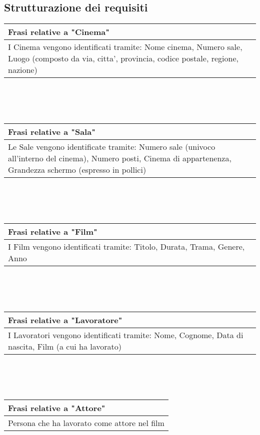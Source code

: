 \documentclass[10pt]{article}
\begin{document}
 	\subsection{Strutturazione dei requisiti}
	\begin{tabular} { |p{16.8cm}| }
 		\hline
 		\rowcolor{lightgray}
 		\textbf{Frasi relative a "Cinema"} \\
 		\hline
 		I Cinema vengono identificati tramite: Nome cinema, Numero sale, Luogo (composto da via, citta', provincia, codice postale, regione, nazione) \\
 		\hline 		
 	\end{tabular}
 	\\\\\\
	\begin{tabular} { |p{16.8cm}| }
	 	\hline
	 	\rowcolor{lightgray}
	 	\textbf{Frasi relative a "Sala"} \\
	 	\hline
	 	Le Sale vengono identificate tramite: Numero sale (univoco all'interno del cinema), Numero posti, Cinema di appartenenza, Grandezza schermo (espresso in pollici) \\
	 	\hline 		
	\end{tabular} 
	\\\\\\
	\begin{tabular} { |p{16.8cm}| }
		\hline
		\rowcolor{lightgray}
		\textbf{Frasi relative a "Film"} \\
		\hline
		I Film vengono identificati tramite: Titolo, Durata, Trama, Genere, Anno \\
		\hline 		
	\end{tabular} 
 	\\\\\\
 	\begin{tabular} { |p{16.8cm}| }
 		\hline
 		\rowcolor{lightgray}
 		\textbf{Frasi relative a "Lavoratore"} \\
 		\hline
 		I Lavoratori vengono identificati tramite: Nome, Cognome, Data di nascita, Film (a cui ha lavorato) \\
 		\hline 		
 	\end{tabular} 
 	\\\\\\
 	\begin{tabular} { |p{16.8cm}| }
 		\hline
 		\rowcolor{lightgray}
 		\textbf{Frasi relative a "Attore"} \\
 		\hline
 		Persona che ha lavorato come attore nel film \\
 		\hline 		
 	\end{tabular} 
\end{document}
